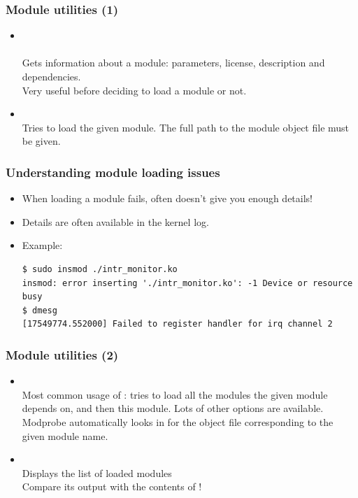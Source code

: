 \begin{frame}
  \frametitle{Module utilities (1)}
  \begin{itemize}
  \item {}\\
    \\
    Gets information about a module: parameters, license, description
    and dependencies.\\
    Very useful before deciding to load a module or not.
  \item {}\\
    Tries to load the given module. The full path to the module object
    file must be given.
  \end{itemize}
\end{frame}

\begin{frame}[fragile]
  \frametitle{Understanding module loading issues}
  \begin{itemize}
  \item When loading a module fails,  often doesn't give
    you enough details!
  \item Details are often available in the kernel log.
  \item Example:\\
\scriptsize
\begin{verbatim}
$ sudo insmod ./intr_monitor.ko
insmod: error inserting './intr_monitor.ko': -1 Device or resource busy
$ dmesg
[17549774.552000] Failed to register handler for irq channel 2
\end{verbatim}
  \end{itemize}
\end{frame}

\begin{frame}
  \frametitle{Module utilities (2)}
  \begin{itemize}
  \item {}\\
    Most common usage of : tries to load all the
    modules the given module depends on, and then this module. Lots of
    other options are available. Modprobe automatically looks in
     for the object file corresponding
    to the given module name.
  \item {}\\
    Displays the list of loaded modules\\
    Compare its output with the contents of !
  \end{itemize}
\end{frame}

